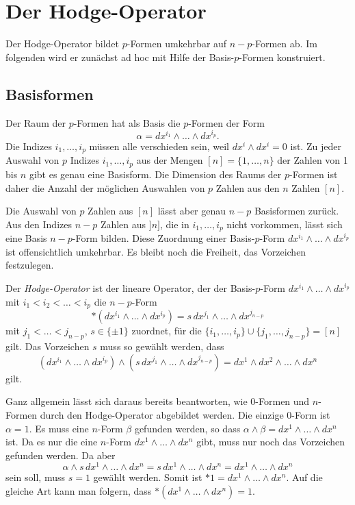%
%
%
\section{Der Hodge-Operator
\label{buch:hodge:section:hodge}}
Der Hodge-Operator bildet $p$-Formen umkehrbar auf $n-p$-Formen ab.
Im folgenden wird er zunächst ad hoc mit Hilfe der Basis-$p$-Formen
konstruiert.

%
%
\subsection{Basisformen}
Der Raum der $p$-Formen hat als Basis die $p$-Formen der Form
\[
\alpha = dx^{i_1}\wedge\dots\wedge dx^{i_p}.
\]
Die Indizes $i_1,\dots,i_p$ müssen alle verschieden sein, weil
$dx^i\wedge dx^i=0$ ist.
Zu jeder Auswahl von $p$ Indizes $i_1,\dots,i_p$ aus der Mengen
$[n]=\{1,\dots,n\}$ der Zahlen von 1 bis $n$ gibt es genau eine Basisform.
Die Dimension des Raums der $p$-Formen ist daher die Anzahl der möglichen
Auswahlen von $p$ Zahlen aus den $n$ Zahlen $[n]$.

Die Auswahl von $p$ Zahlen aus $[n]$ lässt aber genau $n-p$ Basisformen
zurück.
Aus den Indizes $n-p$ Zahlen aus $]n]$, die in $i_1,\dots,i_p$ nicht
vorkommen, lässt sich eine Basis $n-p$-Form bilden.
Diese Zuordnung einer Basis-$p$-Form $dx^{i_1}\wedge\dots\wedge dx^{i_p}$
ist offensichtlich umkehrbar.
Es bleibt noch die Freiheit, das Vorzeichen festzulegen.

\begin{definition}
\label{buch:hodge:hodge:definition:hodge}
Der \emph{Hodge-Operator} ist der lineare Operator, der der
%
Basis-$p$-Form
$dx^{i_1}\wedge\dots\wedge dx^{i_p}$ mit $i_1<i_2<\dots<i_p$
die $n-p$-Form
\[
\ast(dx^{i_1}\wedge\dots\wedge dx^{i_p})
=
s\,dx^{j_1}\wedge\dots\wedge dx^{j_{n-p}}
\]
mit $j_1<\dots <j_{n-p}$, $s\in\{\pm1\}$ zuordnet, für die
$\{i_1,\dots,i_p\}\cup\{j_1,\dots,j_{n-p}\}=[n]$ gilt.
Das Vorzeichen $s$ muss so gewählt werden, dass
\[
(dx^{i_1}\wedge\dots\wedge dx^{i_p})
\wedge
(s\,dx^{j_1}\wedge\dots\wedge dx^{j_{n-p}})
=
dx^1\wedge dx^2\wedge\dots\wedge dx^n
\]
gilt.
%
\end{definition}

Ganz allgemein lässt sich daraus bereits beantworten, wie $0$-Formen und
$n$-Formen durch den Hodge-Operator abgebildet werden.
Die einzige 0-Form ist $\alpha=1$.
Es muss eine $n$-Form $\beta$ gefunden werden, so dass
$\alpha\wedge\beta=dx^1\wedge\dots\wedge dx^n$ ist.
Da es nur die eine $n$-Form $dx^1\wedge\dots\wedge dx^n$ gibt, muss
nur noch das Vorzeichen gefunden werden.
Da aber
\[
\alpha\wedge
s\,dx^1\wedge\dots\wedge dx^n
=
s\,dx^1\wedge\dots\wedge dx^n
=
dx^1\wedge\dots\wedge dx^n
\]
sein soll, muss $s=1$ gewählt werden.
Somit ist $\ast 1=dx^1\wedge\dots\wedge dx^n$.
Auf die gleiche Art kann man folgern, dass
$\ast(dx^1\wedge\dots\wedge dx^n)=1$.


